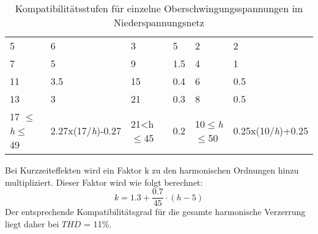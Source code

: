 \begin{appendix}
\begin{table}[ht!]
{\begin{tabular}{|l|l|l|l|l|l|}
			5                                                         & 6                                                     & 3                                                       & 5                                                & 2                                           & 2                                         \\
			7                                                         & 5                                                     & 9                                                       & 1.5                                              & 4                                           & 1                                         \\
			11                                                        & 3.5                                                   & 15                                                      & 0.4                                              & 6                                           & 0.5                                       \\
			13                                                        & 3                                                     & 21                                                      & 0.3                                              & 8                                           & 0.5                                       \\
			17 $\leq$\textit{h}$\leq$ 49                                                   & 2.27x(17/\textit{h})-0.27                                   & 21<h$\leq$45                                                 & 0.2                                              & 10$\leq$\textit{h}$\leq$50                                     & 0.25x(10/\textit{h})+0.25                       \\ \hline
	\end{tabular}}
	\caption{Kompatibilitätsstufen für einzelne Oberschwingungsspannungen im Niederspannungsnetz}\label{tab:kompatibilitätsstufen}
\end{table}

Bei Kurzzeiteffekten wird ein Faktor k zu den harmonischen Ordnungen hinzu multipliziert. Dieser Faktor wird wie folgt berechnet: 
\begin{equation}\label{eq:factor_k_für_kurzzeiteffekte}
k = {1.3+\frac{0.7}{45}\cdot(h-5)}
\end{equation}
Der entsprechende Kompatibilitätsgrad für die gesamte harmonische Verzerrung liegt daher bei $THD$ = 11\%.




\end{appendix}
